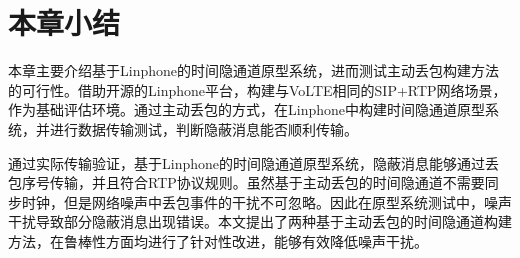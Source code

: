 \section{本章小结}
\label{chap:linphone:conclude}

本章主要介绍基于Linphone的时间隐通道原型系统，进而测试主动丢包构建方法的可行性。借助开源的Linphone平台，构建与VoLTE相同的SIP+RTP网络场景，作为基础评估环境。通过主动丢包的方式，在Linphone中构建时间隐通道原型系统，并进行数据传输测试，判断隐蔽消息能否顺利传输。

通过实际传输验证，基于Linphone的时间隐通道原型系统，隐蔽消息能够通过丢包序号传输，并且符合RTP协议规则。虽然基于主动丢包的时间隐通道不需要同步时钟，但是网络噪声中丢包事件的干扰不可忽略。因此在原型系统测试中，噪声干扰导致部分隐蔽消息出现错误。本文提出了两种基于主动丢包的时间隐通道构建方法，在鲁棒性方面均进行了针对性改进，能够有效降低噪声干扰。